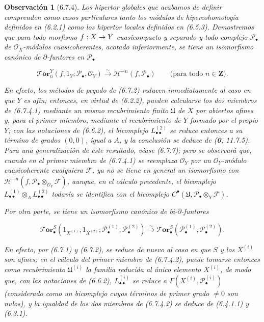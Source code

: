\documentclass[10pt,oneside,openany]{book}
\theoremstyle{egaenv}\newtheorem*{env}{---}
\theoremstyle{egastatement}
\theoremstyle{egadescription}
\newtheorem*{remark}{Observación}
\newcommand{\oldpage}[2][]{\marginnote{\normalfont\scriptsize\textbf{#1}\,|\,#2}\ignorespaces}
\renewcommand{\to}{\mathchoice{\longrightarrow}{\rightarrow}{\rightarrow}{\rightarrow}}
\begin{document}
\begin{remark}[6.7.4]
\label{III.6.7.4}
Los hipertor globales que acabamos de definir comprenden como casos
particulares tanto los \emph{módulos de hipercohomología} definidos en
(6.2.1) como los \emph{hipertor locales} definidos en (6.5.3). Demostremos que
para todo morfismo $f:X\to Y$ \emph{cuasicompacto} y \emph{separado} y todo complejo
$\mathscr P_\bullet$ de $\mathscr O_X$-módulos cuasicoherentes, acotado
inferiormente, se tiene un isomorfismo canónico de $\partial$-funtores en
$\mathscr P_\bullet$

\label{III.6.7.4.1}
\[
  \boldsymbol{\mathscr{T}\!or}_n^Y(f,1_Y;\mathscr P_\bullet,\mathscr O_Y)
  \xrightarrow{\sim}
  \mathcal H^{-n}(f,\mathscr P_\bullet)
  \qquad\text{(para todo $n\in\mathbf Z$)}.
  \tag{6.7.4.1}\label{III.6.7.4.1.fr}
\]

En efecto, los métodos de pegado de (6.7.2) reducen inmediatamente al caso en
que $Y$ es afín; entonces, en virtud de (6.2.2), pueden calcularse los dos
miembros de (6.7.4.1) mediante un mismo recubrimiento finito $\mathfrak U$ de
$X$ por abiertos afines y, para el primer miembro, mediante el recubrimiento de
$Y$ formado por el propio $Y$; con las notaciones de (6.6.2), el bicomplejo
$L_{\bullet\bullet}^{(2)}$ se reduce entonces a su término de grados $(0,0)$,
igual a $A$, y la conclusión se deduce de (\textbf{0}, 11.7.5). Para una
generalización de este resultado, véase (6.7.7); pero se observará que, cuando en
el primer miembro de (6.7.4.1) se reemplaza $\mathscr O_Y$ por un
$\mathscr O_Y$-módulo cuasicoherente \emph{cualquiera} $\mathscr F$, ya no
se tiene en general un isomorfismo con
$\mathcal H^{-n}(f,\mathscr P_\bullet\otimes_{\mathscr O_Y}\mathscr F)$,
aunque, en el cálculo precedente, el bicomplejo
$L_{\bullet\bullet}^{(1)}\otimes_A L_{\bullet\bullet}^{(2)}$ todavía se
identifica con el bicomplejo
$C^\bullet(\mathfrak U,\mathscr P_\bullet\otimes_Y\mathscr F)$.

Por otra parte, se tiene un isomorfismo canónico de
bi-$\partial$-funtores

\label{III.6.7.4.2}
\[
  \boldsymbol{\mathscr{T}\!or}_\bullet^S
  (1_{X^{(1)}},1_{X^{(2)}};
   \mathscr P_\bullet^{(1)},\mathscr P_\bullet^{(2)})
  \xrightarrow{\sim}
  \boldsymbol{\mathscr{T}\!or}_\bullet^S
  (\mathscr P_\bullet^{(1)},\mathscr P_\bullet^{(2)}).
  \tag{6.7.4.2}\label{III.6.7.4.2.fr}
\]

En efecto, por (6.7.1) y (6.7.2), se reduce de nuevo al caso en que $S$ y
los $X^{(i)}$ son afines; en el cálculo del primer miembro de (6.7.4.2), puede
tomarse entonces como
\oldpage[III]{160}
recubrimiento $\mathfrak U^{(i)}$ la familia reducida al
único elemento $X^{(i)}$, de modo que, con las notaciones de (6.6.2),
$L_{\bullet\bullet}^{(i)}$ se reduce a
$\Gamma(X^{(i)},\mathscr P_\bullet^{(i)})$ (considerado como un bicomplejo
cuyos términos de primer grado $\ne0$ son nulos), y la igualdad de los dos
miembros de (6.7.4.2) se deduce de (6.4.1.1) y (6.3.1).
\end{remark}
\end{document}
